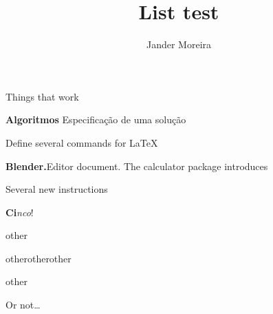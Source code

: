 \documentclass[10pt]{beamer}
\title{List test}
\author{Jander Moreira}
\begin{document}
\maketitle

\begin{frame}
    Things that work

    \hrulefill
    \bigskip
    \small
    \begin{mybox}[columns = 3, equal height = rows, palette = Toasted Peach]
        \item \textbf{Algoritmos}\newline
        Especificação de uma solução
        \item %
        Define several commands for \LaTeX
        \item \textbf{Blender.}\newline Editor document. The calculator package introduces
        \item Several new instructions
        \item \textbf{Ci}\textit{nco}!
        \item other
        \item other\newline other\newline other
        \item other
    \end{mybox}
    \hrulefill

    \bigskip
    Or not\ldots
\end{frame}
\end{document}
